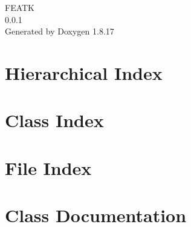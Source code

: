\let\mypdfximage\pdfximage\def\pdfximage{\immediate\mypdfximage}\documentclass[twoside]{book}
\newcommand{\+}{\discretionary{\mbox{\scriptsize$\hookleftarrow$}}{}{}}
\newcommand{\clearemptydoublepage}{%
  \newpage{\pagestyle{empty}\cleardoublepage}%
}
\begin{document}
\hypersetup{pageanchor=false,
             bookmarksnumbered=true,
             pdfencoding=unicode
            }
\begin{titlepage}
\vspace*{7cm}
\begin{center}%
{\Large F\+E\+A\+TK \\[1ex]\large 0.\+0.\+1 }\\
\vspace*{1cm}
{\large Generated by Doxygen 1.8.17}\\
\end{center}
\end{titlepage}
\clearemptydoublepage
{}
\tableofcontents
\clearemptydoublepage
{}
\hypersetup{pageanchor=true}

\chapter{Hierarchical Index}

\chapter{Class Index}

\chapter{File Index}

\chapter{Class Documentation}



























\end{document}
